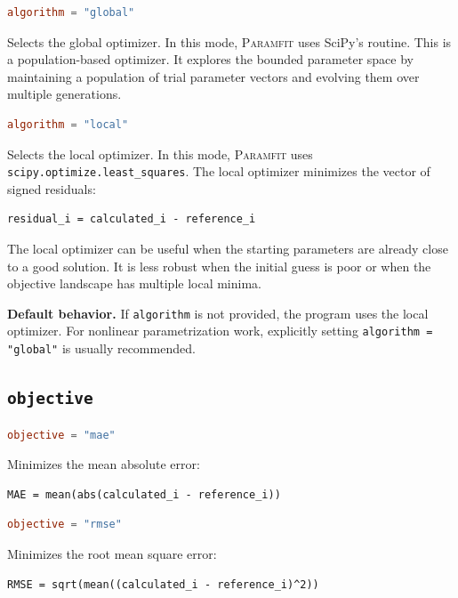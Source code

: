 \documentclass[11pt]{article}
\begin{document}
\begin{lstlisting}[language=toml]
algorithm = "global"
\end{lstlisting}

Selects the global optimizer. In this mode, \textsc{Paramfit} uses SciPy's
 routine. This is a population-based optimizer. It
explores the bounded parameter space by maintaining a population of trial
parameter vectors and evolving them over multiple generations.

\begin{lstlisting}[language=toml]
algorithm = "local"
\end{lstlisting}

Selects the local optimizer. In this mode, \textsc{Paramfit} uses
\texttt{scipy.optimize.least\_squares}. The local optimizer minimizes the vector
of signed residuals:

\begin{lstlisting}
residual_i = calculated_i - reference_i
\end{lstlisting}

The local optimizer can be useful when the starting parameters are already close
to a good solution. It is less robust when the initial guess is poor or when the
objective landscape has multiple local minima.

\textbf{Default behavior.}
If \texttt{algorithm} is not provided, the program uses the local optimizer.
For nonlinear parametrization work, explicitly setting
\texttt{algorithm = "global"} is usually recommended.

\subsection{\texttt{objective}}

\begin{lstlisting}[language=toml]
objective = "mae"
\end{lstlisting}

Minimizes the mean absolute error:

\begin{lstlisting}
MAE = mean(abs(calculated_i - reference_i))
\end{lstlisting}

\begin{lstlisting}[language=toml]
objective = "rmse"
\end{lstlisting}

Minimizes the root mean square error:

\begin{lstlisting}
RMSE = sqrt(mean((calculated_i - reference_i)^2))
\end{lstlisting}
\end{document}
